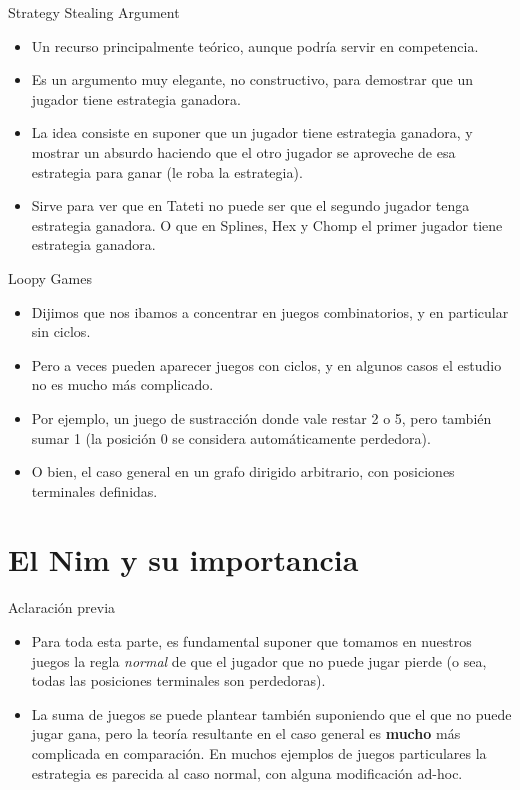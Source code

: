 \documentclass{beamer}
\begin{document}
\begin{frame}{Strategy Stealing Argument}
    \begin{itemize}
        \item Un recurso principalmente teórico, aunque podría servir en competencia.
        \item Es un argumento muy elegante, no constructivo, para demostrar que un jugador tiene estrategia ganadora.
        \item La idea consiste en suponer que un jugador tiene estrategia ganadora, y mostrar un absurdo haciendo que el otro jugador
        se aproveche de esa estrategia para ganar (le roba la estrategia).
        \item Sirve para ver que en Tateti no puede ser que el segundo jugador tenga estrategia ganadora. O que en Splines, Hex y Chomp
        el primer jugador tiene estrategia ganadora.
    \end{itemize}
\end{frame}

\begin{frame}{Loopy Games}
    \begin{itemize}
        \item Dijimos que nos ibamos a concentrar en juegos combinatorios, y en particular sin ciclos.
        \item Pero a veces pueden aparecer juegos con ciclos, y en algunos casos el estudio no es mucho más complicado.
        \item Por ejemplo, un juego de sustracción donde vale restar 2 o 5, pero también sumar 1 (la posición 0 se considera automáticamente perdedora).
        
        \item O bien, el caso general en un grafo dirigido arbitrario, con posiciones terminales definidas.
    \end{itemize}
\end{frame}

\section{El Nim y su importancia}

\begin{frame}{Aclaración previa}
    \begin{itemize}
        \item Para toda esta parte, es fundamental suponer que tomamos en nuestros juegos la regla \textit{normal} de que el jugador que no puede jugar pierde
        (o sea, todas las posiciones terminales son perdedoras).
        \item La suma de juegos se puede plantear también suponiendo que el que no puede jugar gana, pero la teoría resultante en el caso general es
         \textbf{mucho} más complicada en comparación. En muchos ejemplos de juegos particulares la estrategia es parecida al caso normal,
         con alguna modificación ad-hoc.
    \end{itemize}
\end{frame}
\end{document}
